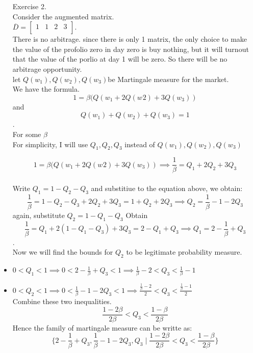 \documentclass[12pt]{article}
\newcommand{\ol}{\overline}
\begin{document}
\begin{itemize}
Exercise 2.\\
 Consider the augmented matrix.\\
 
  $\ol{D}=
    \left[\begin{array}{llll}
    1 & 1 & 2 & 3\\
    \end{array}
    \right].$ 
    \\
    
    There is no arbitrage. since there is only 1 matrix, the only choice to make the value of the profolio zero in day zero is buy nothing, but it will turnout that the value of the porlio at day 1 will be zero. So there will be no arbitrage opportunity.\\
    
    let $Q(w_{1}), Q(w_{2}), Q(w_{3})$be Martingale measure for the market.\\
    We have the formula.\\
    
    $$1 = \beta(Q(w_{1}+2Q(w_{}{2})+3Q(w_{3}))$$ and\\ 
 



$$Q(w_{1}) +  Q(w_{2})+ Q(w_{3}) = 1$$. \\ 
For some $\beta$\\
For simplicity, I will use $Q_{1}, Q_{2}, Q_{3}$ instead of $Q(w_{1}), Q(w_{2}), Q(w_{3})$

$$1 = \beta(Q(w_{1}+2Q(w_{}{2})+3Q(w_{3})) \implies \frac{1}{\beta} = Q_{1} + 2 Q_{2} +3 Q_{3}$$\\
Write $Q_{1} = 1-Q_{2}-Q_{3}$ and substitiue to the equation above, we obtain:\\
$$\frac{1}{\beta} = 1-Q_{2}-Q_{3} + 2 Q_{2} +3 Q_{3} = 1+Q_{2}+2Q_{3} \implies Q_{2} =\frac{1}{\beta} - 1 - 2Q_{3} $$
again, substitute $Q_{2} = 1-Q_{1}-Q_{3}$ Obtain\\
$$\frac{1}{\beta} = Q_{1} + 2(1-Q_{1}-Q_{3}) +3 Q_{3}  = 2-Q_{1}+Q_{3} \implies Q_{1} = 2-\frac{1}{\beta}+Q_{3}$$.\\ Now we will find the bounds for $Q_{2}$ to be legitimate probability measure.

\item $0<Q_{1}<1 \implies 0<2-\frac{1}{\beta}+Q_{3}<1 \implies \frac{1}{\beta} -2 < Q_{3} < \frac{1}{\beta} - 1$
\item $0<Q_{2}<1 \implies 0<\frac{1}{\beta} - 1 - 2Q_{3} <1 \implies \frac{\frac{1}{\beta} - 2}{2} < Q_{3}<\frac{\frac{1}{\beta}-1}{2}$\\
Combine these two inequalities.\\ 
$$\frac{1-2\beta}{2\beta} < Q_{3}<\frac{1-\beta}{2\beta}$$
Hence the family of martingale measure can be writte as:\\
$$\{2-\frac{1}{\beta}+Q_{3},\frac{1}{\beta} - 1 - 2Q_{3} ,Q_{3} \mid \frac{1-2\beta}{2\beta} < Q_{3}<\frac{1-\beta}{2\beta} \}$$



\end{itemize}
\end{document}
